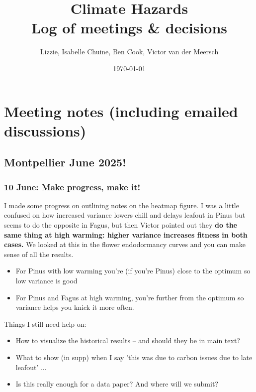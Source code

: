 \documentclass[11pt,letter]{article}
\begin{document}

\renewcommand{\refname}{\CHead{}}

\title{Climate Hazards \\ Log of meetings \& decisions}
\author{Lizzie, Isabelle Chuine, Ben Cook, Victor van der Meersch}
\date{\today}
\maketitle
\tableofcontents

\setlength{\parindent}{0pt}
\setlength{\parskip}{3pt}

\section{Meeting notes (including emailed discussions)}

\subsection{Montpellier June 2025!}

\subsubsection{10 June: Make progress, make it!}

I made some progress on outlining notes on the heatmap figure. I was a little confused on how increased variance lowers chill and delays leafout in Pinus but seems to do the opposite in Fagus, but then Victor pointed out they {\bf do the same thing at high warming: higher variance increases fitness in both cases.} We looked at this in the flower endodormancy curves and you can make sense of all the results.

\begin{itemize}
\item For Pinus with low warming you're (if you're Pinus) close to the optimum so low variance is good
\item For Pinus and Fagus at high warming, you're further from the optimum so variance helps you knick it more often.
\end{itemize}

Things I still need help on:
\begin{itemize}
\item How to visualize the historical results -- and should they be in main text?
\item What to show (in supp) when I say 'this was due to carbon issues due to late leafout' ...
\item Is this really enough for a data paper? And where will we submit?
\end{itemize}
\end{document}
